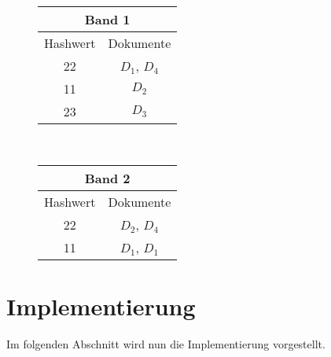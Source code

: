 \begin{figure}
\centering
\begin{tabular}{|c|c|}
		\hline
		\multicolumn{2}{|c|}{Band 1} \\ 
		\hline
		Hashwert & Dokumente	 \\
		\hline

		22 & $D_1$, $D_4$ \\
		11 & $D_2$ \\
		23 & $D_3$ \\
		\hline
\end{tabular}
~
\begin{tabular}{|c|c|}
		\hline
		\multicolumn{2}{|c|}{Band 2} \\
		\hline
		Hashwert & Dokumente	 \\
		\hline
		22 & $D_2$, $D_4$ \\
		11 & $D_1$, $D_1$ \\
		\hline
\end{tabular}
\end{figure}


\section{Implementierung}
\label{impl:cpp-lsh}
Im folgenden Abschnitt wird nun die Implementierung vorgestellt.

